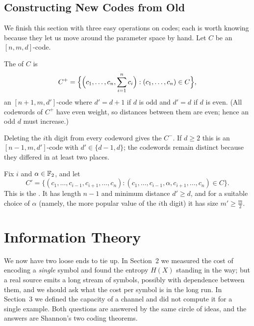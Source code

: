 \documentclass[a4paper]{scrartcl}
\begin{document}
\subsection{Constructing New Codes from Old}

We finish this section with three easy operations on codes; each is worth knowing because they let us move around the parameter space by hand. Let $C$ be an $[n,m,d]$-code.

\begin{example}
	The  of $C$ is
	$$C^+ = \Bigl\{\Bigl(c_1, \dots, c_n, \sum_{i=1}^n c_i\Bigr) : (c_1,\dots,c_n) \in C\Bigr\},$$
	an $[n+1,m,d']$-code where $d' = d+1$ if $d$ is odd and $d' = d$ if $d$ is even. (All codewords of $C^+$ have even weight, so distances between them are even; hence an odd $d$ must increase.)
\end{example}

\begin{example}
	Deleting the $i$th digit from every codeword gives the  $C^-$. If $d \ge 2$ this is an $[n-1,m,d']$-code with $d' \in \{d-1, d\}$; the codewords remain distinct because they differed in at least two places.
\end{example}

\begin{example}
	Fix $i$ and $\alpha \in \mathbb{F}_2$, and let
	$$C' = \{(c_1,\dots,c_{i-1},c_{i+1},\dots,c_n) : (c_1,\dots,c_{i-1},\alpha,c_{i+1},\dots,c_n) \in C\}.$$
	This is the . It has length $n-1$ and minimum distance $d' \ge d$, and for a suitable choice of $\alpha$ (namely, the more popular value of the $i$th digit) it has size $m' \ge \frac{m}{2}$.
\end{example}


\section{Information Theory}\label{sec:infotheory}

We now have two loose ends to tie up. In Section~2 we measured the cost of encoding a \emph{single} symbol and found the entropy $H(X)$ standing in the way; but a real source emits a long stream of symbols, possibly with dependence between them, and we should ask what the cost per symbol is in the long run. In Section~3 we defined the capacity of a channel and did not compute it for a single example. Both questions are answered by the same circle of ideas, and the answers are Shannon's two coding theorems.
\end{document}
